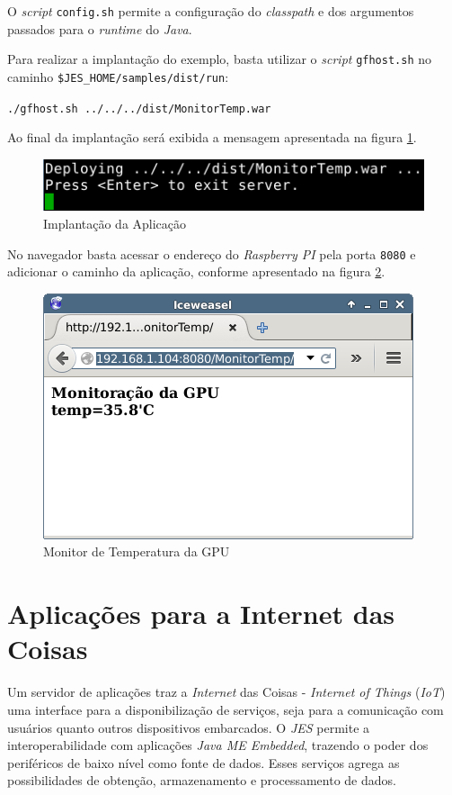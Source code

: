 O \textit{script} \verb|config.sh| permite a configuração do \textit{classpath}
e dos argumentos passados para o \textit{runtime} do \textit{Java}.

Para realizar a implantação do exemplo, basta utilizar o \textit{script}
\verb|gfhost.sh| no caminho \verb|$JES_HOME/samples/dist/run|:

\verb|./gfhost.sh ../../../dist/MonitorTemp.war|

Ao final da implantação será exibida a mensagem apresentada na figura
\ref{fig:java-me/java-jes-deploy}.

\begin{figure}[H]
    \centering
    \includegraphics[width=0.7\linewidth]{figuras/java/java-jes-deploy.png}
    \caption{Implantação da Aplicação}
    \label{fig:java-me/java-jes-deploy}
\end{figure}

No navegador basta acessar o endereço do \textit{Raspberry PI} pela porta
\verb|8080| e adicionar o caminho da aplicação, conforme apresentado na figura
\ref{fig:java-me/java-jes-browser}.

\begin{figure}[H]
    \centering
    \includegraphics[width=0.7\linewidth]{figuras/java/java-jes-browser.png}
    \caption{Monitor de Temperatura da GPU}
    \label{fig:java-me/java-jes-browser}
\end{figure}

\section{Aplicações para a Internet das Coisas}

Um servidor de aplicações traz a \textit{Internet} das Coisas - \textit{Internet of Things} (\textit{IoT}) uma interface
para a disponibilização de serviços, seja para a comunicação com usuários
quanto outros dispositivos embarcados. O \textit{JES} permite a
interoperabilidade com aplicações \textit{Java ME Embedded}, trazendo o poder
dos periféricos de baixo nível como fonte de dados. Esses serviços agrega as
possibilidades de obtenção, armazenamento e processamento de dados.

